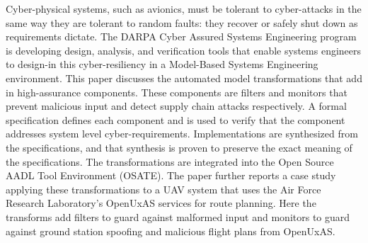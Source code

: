 Cyber-physical systems, such as avionics, must be tolerant to cyber-attacks in the same way they are tolerant to random faults: they recover or safely shut down as requirements dictate. The DARPA Cyber Assured Systems Engineering program is developing design, analysis, and verification tools that enable systems engineers to design-in this cyber-resiliency in a Model-Based Systems Engineering environment. This paper discusses the automated model transformations that add in high-assurance components. These components are filters and monitors that prevent malicious input and detect supply chain attacks respectively. A formal specification defines each component and is used to verify that the component addresses system level cyber-requirements. Implementations are synthesized from the specifications, and that synthesis is proven to preserve the exact meaning of the specifications. The transformations are integrated into the Open Source AADL Tool Environment (OSATE). The paper further reports a case study applying these transformations to a UAV system that uses the Air Force Research Laboratory's OpenUxAS services for route planning. Here the transforms add filters to guard against malformed input and monitors to guard against ground station spoofing and malicious flight plans from OpenUxAS.

